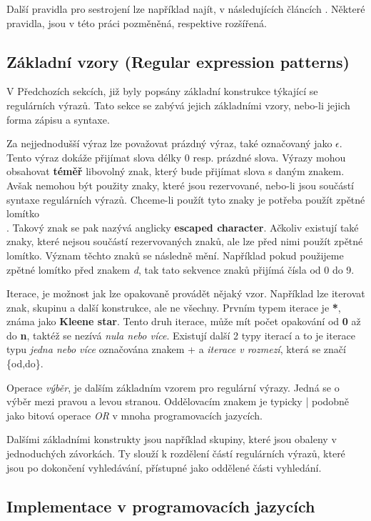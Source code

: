 Další pravidla pro sestrojení lze například najít, v následujících článcích \cite{Thompson1,Thompson2}.
Některé pravidla, jsou v této práci pozměněná, respektive rozšířená.

\subsection*{Základní vzory (Regular expression patterns)}
V Předchozích sekcích, již byly popsány základní konstrukce týkající se regulárních výrazů.
Tato sekce se zabývá jejich základními vzory, nebo-li jejich forma zápisu a syntaxe.

Za nejjednodušší výraz lze považovat prázdný výraz, také označovaný jako $\epsilon$. 
Tento výraz dokáže přijímat slova délky 0 resp. prázdné slova.
Výrazy mohou obsahovat \textbf{téměř} libovolný znak, který bude přijímat slova s daným znakem. 
Avšak nemohou být použity znaky, které jsou rezervované, nebo-li jsou součástí syntaxe regulárních výrazů.
Chceme-li použít tyto znaky je potřeba použít zpětné lomítko \textbf{\\}. 
Takový znak se pak nazývá anglicky \textbf{escaped character}.
Ačkoliv existují také znaky, které nejsou součástí rezervovaných znaků, ale lze před nimi použít zpětné lomítko.
Význam těchto znaků se následně mění. 
Například pokud použijeme zpětné lomítko před znakem \textit{d}, tak tato sekvence znaků přijímá čísla od 0 do 9.

Iterace, je možnost jak lze opakovaně provádět nějaký vzor.
Například lze iterovat znak, skupinu a další konstrukce, ale ne všechny.
Prvním typem iterace je \textbf{*}, známa jako \textbf{Kleene star}.
Tento druh iterace, může mít počet opakování od \textbf{0} až do \textbf{n}, taktéž se nezívá \textit{nula nebo více}. 
Existují další 2 typy iterací a to je iterace typu \textit{jedna nebo více} označována znakem + a \textit{iterace v rozmezí}, která se značí \{od,do\}.

Operace \textit{výběr}, je dalším základním vzorem pro regulární výrazy. 
Jedná se o výběr mezi pravou a levou stranou. 
Oddělovacím znakem je typicky | podobně jako bitová operace \textit{OR} v mnoha programovacích jazycích.

Dalšími základními konstrukty jsou například skupiny, které jsou obaleny v jednoduchých závorkách.
Ty slouží k rozdělení částí regulárních výrazů, které jsou po dokončení vyhledávání, přístupné jako oddělené části vyhledání.

\subsection*{Implementace v programovacích jazycích}\label{sec:impipl}

